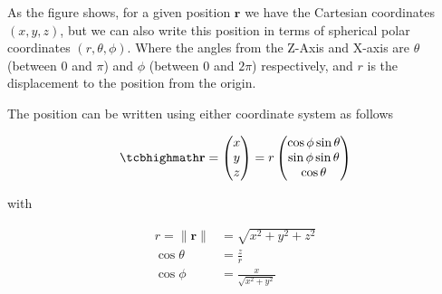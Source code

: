 As the figure shows, for a given position $\mathbf{r}$ we have the Cartesian coordinates $({x},{y},{z})$, but we can also write this position in terms of spherical polar coordinates $(r,\theta,\phi)$.
Where the angles from the Z-Axis and X-axis are $\theta$ (between 0 and $\pi$) and $\phi$ (between 0 and $2\pi$) respectively, and ${r}$ is the displacement to the position from the origin.

The position can be written using either coordinate system as follows

\begin{equation}
	\mhl{
		\mathbf{r} =
		\begin{pmatrix}
			x \\
			y \\
			z \\
		\end{pmatrix}
		= r
		\begin{pmatrix}
			\cos{\phi}\sin{\theta} \\
			\sin{\phi}\sin{\theta} \\
			\cos{\theta}           \\
		\end{pmatrix}
	}
\end{equation}

with

\begin{equation}
	\begin{aligned}
		r = \|\mathbf{r}\| & =\sqrt{x^2 + y^2 + z^2}      \\
		\cos\theta         & = \frac{z}{r}                \\
		\cos\phi           & = \frac{x}{\sqrt{x^2 + y^2}}
	\end{aligned}
\end{equation}



